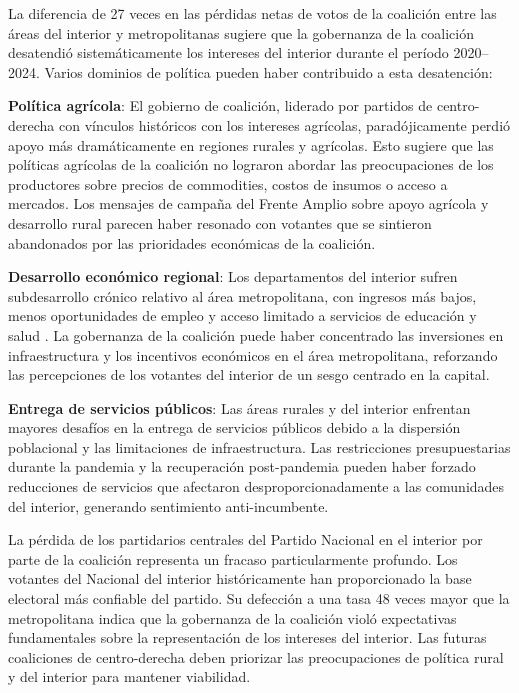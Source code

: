 La diferencia de 27 veces en las pérdidas netas de votos de la coalición entre las áreas del interior y metropolitanas sugiere que la gobernanza de la coalición desatendió sistemáticamente los intereses del interior durante el período 2020--2024. Varios dominios de política pueden haber contribuido a esta desatención:

\textbf{Política agrícola}: El gobierno de coalición, liderado por partidos de centro-derecha con vínculos históricos con los intereses agrícolas, paradójicamente perdió apoyo más dramáticamente en regiones rurales y agrícolas. Esto sugiere que las políticas agrícolas de la coalición no lograron abordar las preocupaciones de los productores sobre precios de commodities, costos de insumos o acceso a mercados. Los mensajes de campaña del Frente Amplio sobre apoyo agrícola y desarrollo rural parecen haber resonado con votantes que se sintieron abandonados por las prioridades económicas de la coalición.

\textbf{Desarrollo económico regional}: Los departamentos del interior sufren subdesarrollo crónico relativo al área metropolitana, con ingresos más bajos, menos oportunidades de empleo y acceso limitado a servicios de educación y salud \citep{ine2023census}. La gobernanza de la coalición puede haber concentrado las inversiones en infraestructura y los incentivos económicos en el área metropolitana, reforzando las percepciones de los votantes del interior de un sesgo centrado en la capital.

\textbf{Entrega de servicios públicos}: Las áreas rurales y del interior enfrentan mayores desafíos en la entrega de servicios públicos debido a la dispersión poblacional y las limitaciones de infraestructura. Las restricciones presupuestarias durante la pandemia y la recuperación post-pandemia pueden haber forzado reducciones de servicios que afectaron desproporcionadamente a las comunidades del interior, generando sentimiento anti-incumbente.

La pérdida de los partidarios centrales del Partido Nacional en el interior por parte de la coalición representa un fracaso particularmente profundo. Los votantes del Nacional del interior históricamente han proporcionado la base electoral más confiable del partido. Su defección a una tasa 48 veces mayor que la metropolitana indica que la gobernanza de la coalición violó expectativas fundamentales sobre la representación de los intereses del interior. Las futuras coaliciones de centro-derecha deben priorizar las preocupaciones de política rural y del interior para mantener viabilidad.

